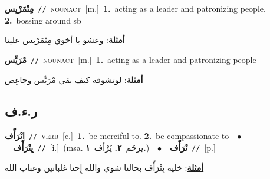 \documentclass[10pt,a4paper,twoside]{article} %
\begin{document}
\begin{multicols}{2}
{{{{{\setlength\topsep{0pt}\textbf{\foreignlanguage{arabic}{مِتْمَرْيِس}}\ {\color{gray}\texttt{//}\color{black}}\ \textsc{noun\textunderscore act}\ [m.]\ \textbf{1.}~acting as a leader and patronizing people.  \textbf{2.}~bossing around sb\  \begin{flushright}\color{gray}\foreignlanguage{arabic}{\textbf{\underline{\foreignlanguage{arabic}{أمثلة}}}: وعشو يا أخوي مِتْمَرْيِس علينا}\end{flushright}\color{black}} \vspace{2mm}

{\setlength\topsep{0pt}\textbf{\foreignlanguage{arabic}{مْرَيِّس}}\ {\color{gray}\texttt{//}\color{black}}\ \textsc{noun\textunderscore act}\ [m.]\ \textbf{1.}~acting as a leader and patronizing people\  \begin{flushright}\color{gray}\foreignlanguage{arabic}{\textbf{\underline{\foreignlanguage{arabic}{أمثلة}}}: لوتشوفه كيف بقى مْرَيِّس وجاعِص}\end{flushright}\color{black}} \vspace{2mm}

\vspace{-3mm}
\subsection*{\color{blue}\foreignlanguage{arabic}{ر.ء.ف}\color{blue}{}} 

{\setlength\topsep{0pt}\textbf{\foreignlanguage{arabic}{اِتْرَأّف}}\ {\color{gray}\texttt{//}\color{black}}\ \textsc{verb}\ [c.]\ \textbf{1.}~be merciful to.  \textbf{2.}~be compassionate to\ \ $\bullet$\ \ \setlength\topsep{0pt}\textbf{\foreignlanguage{arabic}{يِتْرَأّف}}\ {\color{gray}\texttt{//}\color{black}}\ [i.]\ \color{gray}(msa. \foreignlanguage{arabic}{يرحَم}~\foreignlanguage{arabic}{\textbf{٢.}}  \foreignlanguage{arabic}{يَرْأف}~\foreignlanguage{arabic}{\textbf{١.}})\color{black}\ \ $\bullet$\ \ \setlength\topsep{0pt}\textbf{\foreignlanguage{arabic}{تْرَأّف}}\ {\color{gray}\texttt{//}\color{black}}\ [p.]\  \begin{flushright}\color{gray}\foreignlanguage{arabic}{\textbf{\underline{\foreignlanguage{arabic}{أمثلة}}}: خليه يِتْرَأّف بحالنا شوي والله إِحنا غلبانين وعباب الله}\end{flushright}\color{black}} \vspace{2mm}

}}}}
\end{multicols}
\end{document}
